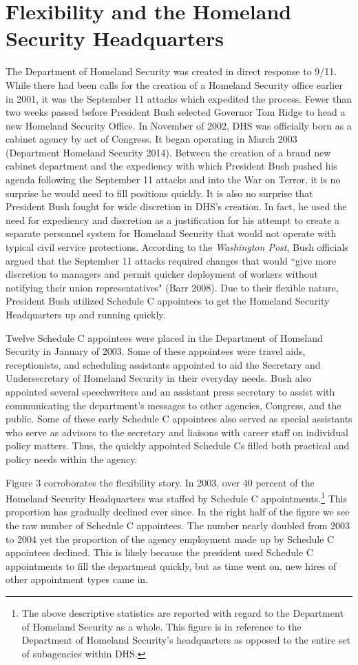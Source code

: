 \documentclass[12pt]{article}
\begin{document}
\section*{Flexibility and the Homeland Security Headquarters}
The Department of Homeland Security was created in direct response to 9/11. While there had been calls for the creation of a Homeland Security office earlier in 2001, it was the September 11 attacks which expedited the process. Fewer than two weeks passed before President Bush selected Governor Tom Ridge to head a new Homeland Security Office. In November of 2002, DHS was officially born as a cabinet agency by act of Congress. It began operating in March 2003 (Department Homeland Security 2014). Between the creation of a brand new cabinet department and the expediency with which President Bush pushed his agenda following the September 11 attacks and into the War on Terror, it is no surprise he would need to fill positions quickly. It is also no surprise that President Bush fought for wide discretion in DHS's creation. In fact, he used the need for expediency and discretion as a justification for his attempt to create a separate personnel system for Homeland Security that would not operate with typical civil service protections. According to the \textit{Washington Post}, Bush officials argued that the September 11 attacks required changes that would ``give more discretion to managers and permit quicker deployment of workers without notifying their union representatives" (Barr 2008). Due to their flexible nature, President Bush utilized Schedule C appointees to get the Homeland Security Headquarters up and running quickly.

Twelve Schedule C appointees were placed in the Department of Homeland Security in January of 2003. Some of these appointees were travel aids, receptionists, and scheduling assistants appointed to aid the Secretary and Undersecretary of Homeland Security in their everyday needs. Bush also appointed several speechwriters and an assistant press secretary to assist with communicating the department's messages to other agencies, Congress, and the public. Some of these early Schedule C appointees also served as special assistants who serve as advisors to the secretary and liaisons with career staff on individual policy matters. Thus, the quickly appointed Schedule Cs filled both practical and policy needs within the agency. 

Figure 3 corroborates the flexibility story. In 2003, over 40 percent of the Homeland Security Headquarters was staffed by Schedule C appointments.\footnote{The above descriptive statistics are reported with regard to the Department of Homeland Security as a whole. This figure is in reference to the Department of Homeland Security's headquarters as opposed to the entire set of subagencies within DHS.} This proportion has gradually declined ever since. In the right half of the figure we see the raw number of Schedule C appointees. The number nearly doubled from 2003 to 2004 yet the proportion of the agency employment made up by Schedule C appointees declined. This is likely because the president used Schedule C appointments to fill the department quickly, but as time went on, new hires of other appointment types came in.
\end{document}
